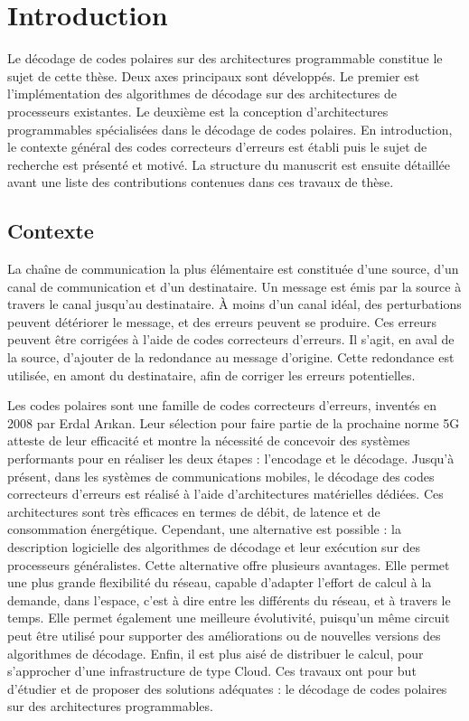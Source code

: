 \chapter*{Introduction}

Le décodage de codes polaires sur des architectures programmable constitue le sujet de cette thèse. Deux axes principaux sont développés. Le premier est l'implémentation des algorithmes de décodage sur des architectures de processeurs existantes. Le deuxième est la conception d'architectures programmables spécialisées dans le décodage de codes polaires. En introduction, le contexte général des codes correcteurs d'erreurs est établi puis le sujet de recherche est présenté et motivé. La structure du manuscrit est ensuite détaillée avant une liste des contributions contenues dans ces travaux de thèse.

\section*{Contexte}
La chaîne de communication la plus élémentaire est constituée d'une source, d'un canal de communication et d'un destinataire. Un message est émis par la source à travers le canal jusqu'au destinataire. \`A moins d'un canal idéal, des perturbations peuvent détériorer le message, et des erreurs peuvent se produire. Ces erreurs peuvent être corrigées à l'aide de codes correcteurs d'erreurs. Il s'agit, en aval de la source, d'ajouter de la redondance au message d'origine. Cette redondance est utilisée, en amont du destinataire, afin de corriger les erreurs potentielles.

Les codes polaires sont une famille de codes correcteurs d'erreurs, inventés en 2008 par Erdal Ar{\i}kan. Leur sélection pour faire partie de la prochaine norme 5G atteste de leur efficacité et montre la nécessité de concevoir des systèmes performants pour en réaliser les deux étapes : l'encodage et le décodage. Jusqu'à présent, dans les systèmes de communications mobiles, le décodage des codes correcteurs d'erreurs est réalisé à l'aide d'architectures matérielles dédiées. Ces architectures sont très efficaces en termes de débit, de latence et de consommation énergétique. Cependant, une alternative est possible : la description logicielle des algorithmes de décodage et leur exécution sur des processeurs généralistes. Cette alternative offre plusieurs avantages. Elle permet une plus grande flexibilité du réseau, capable d'adapter l'effort de calcul à la demande, dans l'espace, c'est à dire entre les différents \noeuds du réseau, et à travers le temps. Elle permet également une meilleure évolutivité, puisqu'un même circuit peut être utilisé pour supporter des améliorations ou de nouvelles versions des algorithmes de décodage. Enfin, il est plus aisé de distribuer le calcul, pour s'approcher d'une infrastructure de type Cloud. Ces travaux ont pour but d'étudier et de proposer des solutions adéquates : le décodage de codes polaires sur des architectures programmables.

